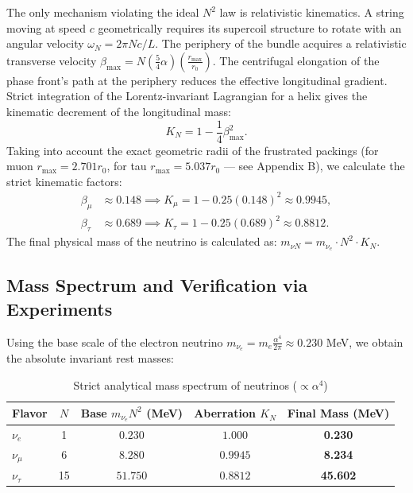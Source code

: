 \documentclass[11pt,a4paper]{article}
\begin{document}
	The only mechanism violating the ideal $N^2$ law is relativistic kinematics. A string moving at speed $c$ geometrically requires its supercoil structure to rotate with an angular velocity $\omega_N = 2\pi N c / L$. The periphery of the bundle acquires a relativistic transverse velocity $\beta_{\text{max}} = N (\frac{5}{4}\alpha) (\frac{r_{\text{max}}}{r_0})$. 
	The centrifugal elongation of the phase front's path at the periphery reduces the effective longitudinal gradient. Strict integration of the Lorentz-invariant Lagrangian for a helix gives the kinematic decrement of the longitudinal mass:
	\begin{equation}
		K_N = 1 - \frac{1}{4} \beta_{\text{max}}^2.
	\end{equation}
	Taking into account the exact geometric radii of the frustrated packings (for muon $r_{\text{max}} = 2.701 r_0$, for tau $r_{\text{max}} = 5.037 r_0$ — see Appendix B), we calculate the strict kinematic factors:
	\begin{align}
		\beta_\mu &\approx 0.148 \implies K_\mu = 1 - 0.25(0.148)^2 \approx \mathbf{0.9945}, \\
		\beta_\tau &\approx 0.689 \implies K_\tau = 1 - 0.25(0.689)^2 \approx \mathbf{0.8812}.
	\end{align}
	The final physical mass of the neutrino is calculated as: $m_{\nu N} = m_{\nu_e} \cdot N^2 \cdot K_N$.
	
\subsection{Mass Spectrum and Verification via Experiments}
	Using the base scale of the electron neutrino $m_{\nu_e} = m_e \frac{\alpha^4}{2\pi} \approx 0.230$ MeV, we obtain the absolute invariant rest masses:
	
	\begin{table}[h]
		\centering
		\caption{Strict analytical mass spectrum of neutrinos ($\propto \alpha^4$) }
		\renewcommand{\arraystretch}{1.3}
		\begin{tabular}{lcccc}
			\toprule
			Flavor & $N$ & Base $m_{\nu_e} N^2$ (MeV) & Aberration $K_N$ & Final Mass (MeV) \\
			\midrule
			$\nu_e$   & 1  & $0.230$  & $1.000$ & \textbf{0.230} \\
			$\nu_\mu$ & 6  & $8.280$  & $0.9945$ & \textbf{8.234} \\
			$\nu_\tau$ & 15 & $51.750$ & $0.8812$ & \textbf{45.602} \\
			\bottomrule
		\end{tabular}
	\end{table}
	
\end{document}
